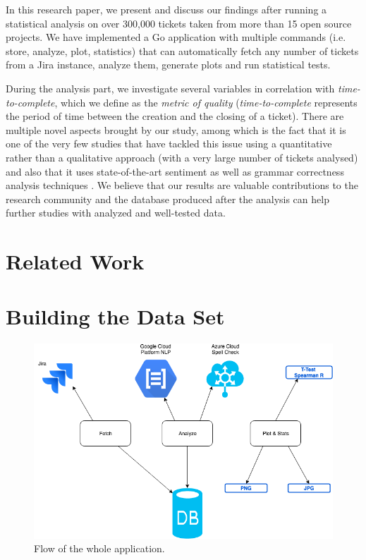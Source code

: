 \documentclass{mpaper}
\begin{document}
In this research paper, we present and discuss our findings after running a statistical analysis 
on over 300,000 tickets taken from more than 15 open source projects. We have implemented a Go application 
with multiple commands (i.e. store, analyze, plot, statistics) that can automatically fetch any number of tickets 
from a Jira instance, analyze them, generate plots and run statistical tests. 

During the analysis part, we investigate several variables in correlation with \emph{time-to-complete}, 
which we define as the \emph{metric of quality} (\emph{time-to-complete} represents the period of time between the creation 
and the closing of a ticket). There are multiple novel aspects brought by our study, among which is the fact that it is one of 
the very few studies that have tackled this issue using a quantitative rather than a qualitative approach (with a very 
large number of tickets analysed) and also that it uses state-of-the-art sentiment \cite{wilson2005recognizing} as well as 
grammar correctness analysis techniques \cite{wilson2005recognizing}. We believe that our results are valuable 
contributions to the research community and the database produced after the analysis can help further studies with 
analyzed and well-tested data.

\section{Related Work}

\section{Building the Data Set}

\begin{figure}
\begin{center}
\includegraphics[scale=0.3]{images/flow.png}
\end{center}
\caption{\label{fig-eg}Flow of the whole application.}
\end{figure}
\end{document}
